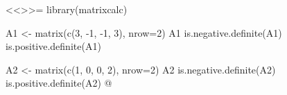 \documentclass
[answers]
{exercise_sheet}
\begin{document}
\makeatletter\if@answers\begin{Answer}{2}
<<>>=
library(matrixcalc)

A1 <- matrix(c(3, -1, -1, 3), nrow=2)
A1
is.negative.definite(A1)
is.positive.definite(A1)

A2 <- matrix(c(1, 0, 0, 2), nrow=2)
A2
is.negative.definite(A2)
is.positive.definite(A2)
@
\end{Answer}\fi\makeatother
\end{document}
